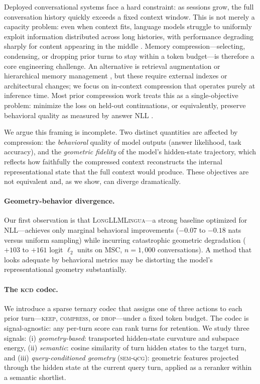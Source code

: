 \documentclass[11pt]{article}
\newcommand{\kcd}{\textsc{kcd}}
\newcommand{\semqcg}{\textsc{sem-qcg}}
\begin{document}
Deployed conversational systems face a hard constraint: as sessions grow,
the full conversation history quickly exceeds a fixed context window.
This is not merely a capacity problem: even when context fits, language models
struggle to uniformly exploit information distributed across long histories,
with performance degrading sharply for content appearing in the middle
\citep{liu-etal-2024-lost}.
Memory compression---selecting, condensing, or dropping prior turns to stay
within a token budget---is therefore a core engineering challenge.
An alternative is retrieval augmentation \citep{lewis-etal-2020-retrieval}
or hierarchical memory management \citep{packer-etal-2023-memgpt},
but these require external indexes or architectural changes;
we focus on in-context compression that operates purely at inference time.
Most prior compression work treats this as a single-objective problem:
minimize the loss on held-out continuations, or equivalently, preserve
behavioral quality as measured by answer NLL
\citep{jiang-etal-2024-longllmlingua, pan-etal-2024-llmlingua2}.

We argue this framing is incomplete.
Two distinct quantities are affected by compression:
the \emph{behavioral} quality of model outputs (answer likelihood, task accuracy),
and the \emph{geometric fidelity} of the model's hidden-state trajectory,
which reflects how faithfully the compressed context reconstructs the
internal representational state that the full context would produce.
These objectives are not equivalent and, as we show, can diverge dramatically.

\paragraph{Geometry-behavior divergence.}
Our first observation is that \textsc{LongLLMLingua}---a strong baseline
optimized for NLL---achieves only marginal behavioral improvements
($-0.07$ to $-0.18$ nats versus uniform sampling)
while incurring catastrophic geometric degradation
($+103$ to $+161$ logit $\ell_2$ units on MSC, $n{=}1{,}000$ conversations).
A method that looks adequate by behavioral metrics
may be distorting the model's representational geometry substantially.

\paragraph{The \kcd{} codec.}
We introduce a sparse ternary codec that assigns one of three actions to each
prior turn---\textsc{keep}, \textsc{compress}, or \textsc{drop}---under a
fixed token budget.
The codec is signal-agnostic: any per-turn score can rank turns for retention.
We study three signals:
(i) \emph{geometry-based}: transported hidden-state curvature and subspace energy,
(ii) \emph{semantic}: cosine similarity of turn hidden states to the target turn,
and (iii) \emph{query-conditioned geometry} (\semqcg{}):
geometric features projected through the hidden state at the current query turn,
applied as a reranker within a semantic shortlist.
\end{document}
